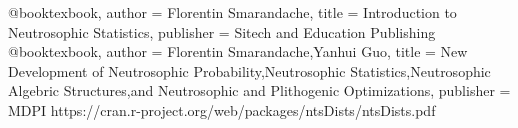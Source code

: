 \documentclass[12pt,a4paper,oneside]{article}
\begin{document}
\begin{thebibliography}{11}
{}
\newline\newline
[8]\hspace{0.3cm}@book{texbook,
  author = {Florentin Smarandache},
  title = {Introduction to Neutrosophic Statistics},
  publisher = {Sitech and Education Publishing}
}
\newline\newline
[9]\hspace{0.3cm}@book{texbook,
  author = {Florentin Smarandache,Yanhui Guo},
  title = {New Development of Neutrosophic Probability,Neutrosophic Statistics,Neutrosophic Algebric Structures,and Neutrosophic and Plithogenic Optimizations},
  publisher = {MDPI}
}
\newline\newline
[10]\hspace{0.3cm}https://cran.r-project.org/web/packages/ntsDists/ntsDists.pdf
\end{thebibliography}
\end{document}
